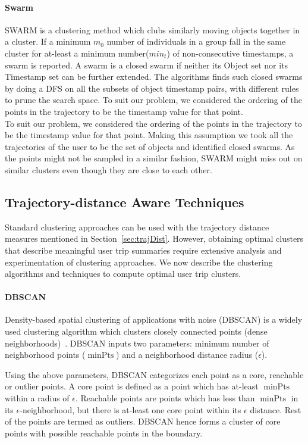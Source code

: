 \paragraph{Swarm}
SWARM is a clustering method which clubs similarly moving objects together in a cluster. If a minimum $m_{0}$ number of individuals in a group fall in the same cluster for at-least a minimum number($min_{t}$) of non-consecutive timestamps, a swarm is reported. A swarm is a closed swarm if neither its Object set nor its Timestamp set can be further extended. The algorithms finds such closed swarms by doing a DFS on all the subsets of object timestamp pairs, with different rules to prune the search space.
To suit our problem, we considered the ordering of the points in the trajectory to be the timestamp value for that point. \\
To suit our problem, we considered the ordering of the points in the trajectory to be the timestamp value for that point. Making this assumption we took all the trajectories of the user to be the set of objects and identified closed swarms. As the points might not be sampled in a similar fashion, SWARM might miss out on similar clusters even though they are close to each other. 

\subsection{Trajectory-distance Aware Techniques}
\label{sec:trajDistClustAlgos}
Standard clustering approaches can be used with the trajectory distance measures mentioned in Section~\ref{sec:trajDist}. However, obtaining optimal clusters that describe meaningful user trip summaries require extensive analysis and experimentation of clustering approaches. We now describe the clustering algorithms and techniques to compute optimal user trip clusters.

\paragraph{DBSCAN}
\label{sec:dbscan}
Density-based spatial clustering of applications with noise (DBSCAN) is a widely used clustering algorithm which clusters closely connected points (dense neighborhoods)~\cite{ref:dbscan}. DBSCAN inputs two parameters: minimum number of neighborhood points ($\operatorname{minPts}$) and a neighborhood distance radius ($\epsilon$). 

Using the above parameters, DBSCAN categorizes each point as a core, reachable or outlier points. A core point is defined as a point which has at-least $\operatorname{minPts}$ within a radius of $\epsilon$. Reachable points are points which has less than $\operatorname{minPts}$ in its $\epsilon$-neighborhood, but there is at-least one core point within its $\epsilon$ distance. Rest of the points are termed as outliers. DBSCAN hence forms a cluster of core points with possible reachable points in the boundary. 

